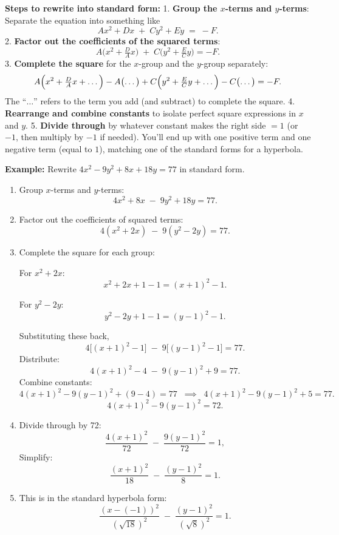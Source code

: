 \documentclass{article}
\begin{document}
\begin{multicols}{2}
\textbf{Steps to rewrite into standard form:}
1. \textbf{Group the \(x\)-terms and \(y\)-terms}:  
   Separate the equation into something like
   \[
   Ax^2 + Dx \;+\; Cy^2 + Ey \;=\; -F.
   \]
2. \textbf{Factor out the coefficients of the squared terms}:
   \[
   A\bigl(x^2 + \tfrac{D}{A}x\bigr) \;+\; C\bigl(y^2 + \tfrac{E}{C}y\bigr) = -F.
   \]
3. \textbf{Complete the square} for the \(x\)-group and the \(y\)-group separately:
   \[
   A\Bigl(x^2 + \tfrac{D}{A}x + \dots\Bigr) - A\bigl(\dots\bigr)
   + C\Bigl(y^2 + \tfrac{E}{C}y + \dots\Bigr) - C\bigl(\dots\bigr)
   = -F.
   \]
   The “\(\dots\)” refers to the term you add (and subtract) to complete the square. 
4. \textbf{Rearrange and combine constants} to isolate perfect square expressions in \(x\) and \(y\). 
5. \textbf{Divide through} by whatever constant makes the right side \(=1\) (or \(-1\), then multiply by \(-1\) if needed). 
   You’ll end up with one positive term and one negative term (equal to \(1\)), matching one of the standard forms for a hyperbola.

\textbf{Example:}  
Rewrite \(4x^2 - 9y^2 + 8x + 18y = 77\) in standard form.
\begin{enumerate}
\item Group \(x\)-terms and \(y\)-terms:
  \[
    4x^2 + 8x \;-\; 9y^2 + 18y = 77.
  \]
\item Factor out the coefficients of squared terms:
  \[
    4(x^2 + 2x) \;-\; 9(y^2 - 2y) = 77.
  \]
\item Complete the square for each group:

  For \(x^2 + 2x\): 
  \[
    x^2 + 2x + 1 - 1 = (x+1)^2 - 1.
  \]

  For \(y^2 - 2y\):
  \[
    y^2 - 2y + 1 - 1 = (y-1)^2 - 1.
  \]

  Substituting these back,
  \[
    4\bigl[(x+1)^2 - 1\bigr]
    \;-\; 9\bigl[(y-1)^2 - 1\bigr] 
    = 77.
  \]
  Distribute:
  \[
    4(x+1)^2 - 4 
    \;-\; 9(y-1)^2 + 9 
    = 77.
  \]
  Combine constants:
  \[
    4(x+1)^2 - 9(y-1)^2 + (9 - 4) = 77
    \;\;\implies\;\;
    4(x+1)^2 - 9(y-1)^2 + 5 = 77.
  \]
  \[
    4(x+1)^2 - 9(y-1)^2 = 72.
  \]

\item Divide through by 72:
  \[
    \frac{4(x+1)^2}{72} \;-\; \frac{9(y-1)^2}{72} = 1,
  \]
  Simplify:
  \[
    \frac{(x+1)^2}{18} \;-\; \frac{(y-1)^2}{8} = 1.
  \]
\item This is in the standard hyperbola form:
  \[
    \frac{(x - (-1))^2}{(\sqrt{18})^2} 
    \;-\; 
    \frac{(y - 1)^2}{(\sqrt{8})^2} 
    = 1.
  \]
\end{enumerate}

\end{multicols}
\end{document}
